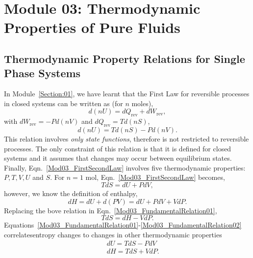 \documentclass[12pts,a4paper,amsmath,amssymb,floatfix]{article}%
\begin{document}
\section{Module 03: Thermodynamic Properties of Pure Fluids}\label{Section:03}


\subsection{Thermodynamic Property Relations for Single Phase Systems}

In Module~\ref{Section:01}, we have learnt that the First Law for reversible processes in closed systems can be written as (for $n$ moles),
   \begin{equation}
       d\left(n U\right) = d Q_{\text{rev}} + d W_{\text{rev}},\label{Mod03_FirstLaw}
   \end{equation} 
with $d W_{\text{rev}} = -Pd(nV)$ and $d Q_{\text{rev}}=Td(nS)$,
   \begin{equation}
       d\left(n U\right) = T d(nS) - Pd(nV).\label{Mod03_FirstSecondLaw}
   \end{equation} 
This relation involves {\it only state functions}, therefore is not restricted to reversible processes. The only constraint of this relation is that it is defined for closed systems and it assumes that changes may occur between equilibrium states. Finally, Eqn.~\ref{Mod03_FirstSecondLaw} involves five thermodynamic properties: $P, T, V, U$ and $S$. For $n=1$ mol, Eqn.~\ref{Mod03_FirstSecondLaw} becomes,
   \begin{equation}
      TdS = dU + PdV,\label{Mod03_FundamentalRelation01}
   \end{equation}
however, we know the definition of enthalpy,
   \begin{displaymath}
      dH = dU + d(PV) = dU + PdV + VdP.
   \end{displaymath}
Replacing the bove relation in Eqn.~\ref{Mod03_FundamentalRelation01},
   \begin{equation}
      TdS = dH - VdP.\label{Mod03_FundamentalRelation02}
   \end{equation}
Equations~\ref{Mod03_FundamentalRelation01}-\ref{Mod03_FundamentalRelation02} correlatesentropy changes to changes in other thermodynamic properties
   \begin{eqnarray}
      && dU = TdS - PdV \nonumber \\
      && dH = TdS + VdP. \nonumber 
   \end{eqnarray}
\end{document}
